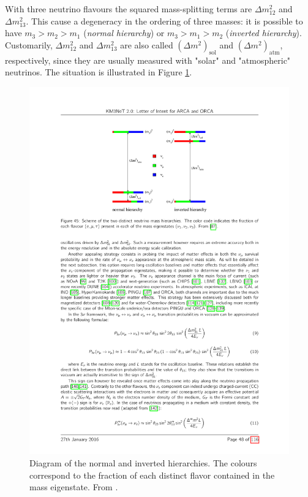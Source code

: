 With three neutrino flavours the squared mass-splitting terms are $\Delta m_{12}^2$ and $\Delta m_{13}^2$. This cause a degeneracy in the ordering of three masses: it is possible to have $m_3 > m_2 > m_1$ (\emph{normal hierarchy}) or $m_3 > m_1 > m_2$ (\emph{inverted hierarchy}). Customarily, $\Delta m_{12}^2$ and $\Delta m_{13}^2$ are also called $(\Delta m^2)_{\mathrm{sol}}$ and $(\Delta m^2)_{\mathrm{atm}}$, respectively, since they are usually measured with "solar" and "atmospheric" neutrinos. The situation is illustrated in Figure \ref{fig:masshierarchy}.

\begin{figure}
    \centering
    \includegraphics[width=0.75\linewidth]{figures/masshierarchy.pdf}
    \caption{Diagram of the normal and inverted hierarchies. The colours correspond to the fraction of each distinct flavor contained in the mass eigenstate. From \cite{Cahn:2013taa}.}
    \label{fig:masshierarchy}
\end{figure}

